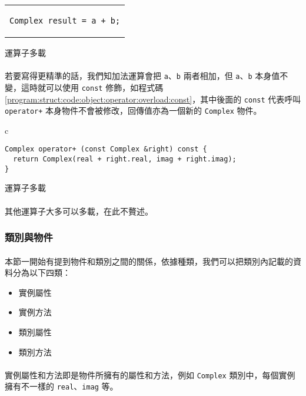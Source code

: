 \documentclass[12pt,a4paper,oneside]{report}
\begin{document}
\begin{CJK}{UTF8}{bkai}
\begin{code}[h!]
\begin{tabular}{c}
\begin{lstlisting}
Complex result = a + b;
\end{lstlisting}
\end{tabular}
\caption{運算子多載}
\label{program:struct:code:object:operator:overload}
\end{code}

\paragraph{}若要寫得更精準的話，我們知加法運算會把 \lstinline!a!、\lstinline!b! 兩者相加，但 \lstinline!a!、\lstinline!b! 本身值不變，這時就可以使用 \lstinline!const! 修飾，如程式碼 \ref{program:struct:code:object:operator:overload:const}，其中後面的 \lstinline!const! 代表呼叫 \lstinline!operator+! 本身物件不會被修改，回傳值亦為一個新的 \lstinline!Complex! 物件。

\begin{code}[h!]
\centering
\begin{tabular}{c}
\begin{lstlisting}
Complex operator+ (const Complex &right) const {
  return Complex(real + right.real, imag + right.imag);
}
\end{lstlisting}
\end{tabular}
\caption{運算子多載}
\label{program:struct:code:object:operator:overload:const}
\end{code}

\paragraph{}其他運算子大多可以多載，在此不贅述。

\subsubsection{類別與物件}

\paragraph{}本節一開始有提到物件和類別之間的關係，依據種類，我們可以把類別內記載的資料分為以下四類：
\begin{itemize}
\item 實例屬性
\item 實例方法
\item 類別屬性
\item 類別方法
\end{itemize}

\paragraph{}實例屬性和方法即是物件所擁有的屬性和方法，例如 \lstinline!Complex! 類別中，每個實例擁有不一樣的 \lstinline!real!、\lstinline!imag! 等。


\end{CJK}
\end{document}
